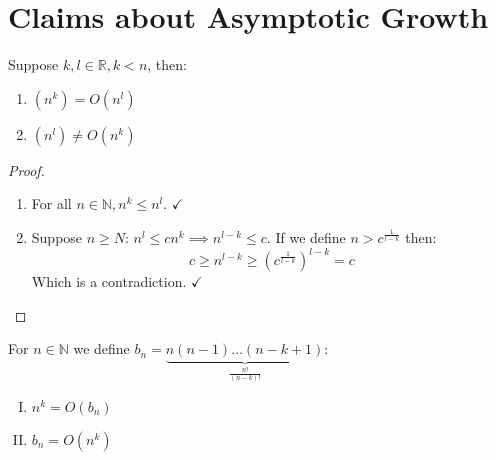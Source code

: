 \documentclass[00_complete]{subfiles}
\begin{document}
\section{Claims about Asymptotic Growth}
\begin{claim}
    Suppose $k,l \in \mathbb{R}, k<n$, then:
    \begin{enumerate}
        \item $(n^k) = O(n^l)$
        \item $(n^l) \neq O(n^k)$
    \end{enumerate}
\end{claim}
\begin{proof}
    \begin{enumerate}
        \item For all $n \in \mathbb{N}, n^k \leq n^l$. $\checkmark$
        \item Suppose $n \geq N$: $n^l \leq cn^k \implies n^{l-k}\leq c$. If we
            define $n>c^\frac{1}{l-k}$ then:
            $$c \geq n^{l-k}\geq \left(c^{\frac{1}{l-k}}\right)^{l-k} = c$$
            Which is a contradiction. $\checkmark$
    \end{enumerate}
\end{proof}
\begin{claim}
    For $n \in \mathbb{N}$ we define
    $b_n=\underbrace{n(n-1)\dots(n-k+1)}_{\frac{n!}{(n-k)!}}$:
    \begin{enumerate}[I.]
        \item $n^k = O(b_n)$
        \item $b_n = O(n^k)$
    \end{enumerate}
\end{claim}
\end{document}
